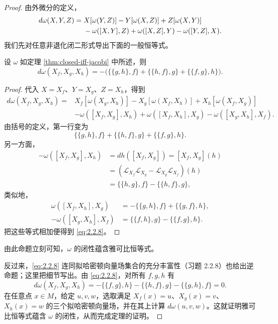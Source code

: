 \begin{proof}
由外微分的定义，
\begin{align}
  d\omega(X,Y,Z)
  ={}&X[\omega(Y,Z)]-Y[\omega(X,Z)]+Z[\omega(X,Y)] \notag\\
    &-\omega([X,Y],Z)+\omega([X,Z],Y)-\omega([Y,Z],X).
  \label{eq:2.2.7}
\end{align}
我们先对任意非退化闭二形式导出下面的一般恒等式。

\begin{proposition}
\label{prop:domega-jacobiator}
设 $\omega$ 如定理 \ref{thm:closed-iff-jacobi} 中所述，则
\begin{equation}
  d\omega(X_f,X_g,X_h)
  =-\bigl(\{\{g,h\},f\}+\{\{h,f\},g\}+\{\{f,g\},h\}\bigr).
  \label{eq:2.2.8}
\end{equation}
\end{proposition}

\begin{proof}
代入 $X=X_f$、$Y=X_g$、$Z=X_h$，得到
\begin{align*}
 d\omega(X_f,X_g,X_h)
 ={}&X_f[\omega(X_g,X_h)]-X_g[\omega(X_f,X_h)]+X_h[\omega(X_f,X_g)]\\
 &-\omega([X_f,X_g],X_h)+\omega([X_f,X_h],X_g)-\omega([X_g,X_h],X_f).
\end{align*}
由括号的定义，第一行变为
\[
  \{\{g,h\},f\}+\{\{h,f\},g\}+\{\{f,g\},h\}.
\]
另一方面，
\begin{align*}
 -\omega([X_f,X_g],X_h)
 &=dh([X_f,X_g])=[X_f,X_g](h)\\
 &=(\mathcal L_{X_f}\mathcal L_{X_g}-\mathcal L_{X_g}\mathcal L_{X_f})(h)\\
 &=\{\{h,g\},f\}-\{\{h,f\},g\},
\end{align*}
类似地，
\begin{align*}
 \omega([X_f,X_h],X_g)&=-\{\{g,h\},f\}+\{\{g,f\},h\},\\
 -\omega([X_g,X_h],X_f)&=\{\{f,h\},g\}-\{\{f,g\},h\}.
\end{align*}
把这些等式相加便得到 \eqref{eq:2.2.8}。
\end{proof}

由此命题立刻可知，$\omega$ 的闭性蕴含雅可比恒等式。

反过来，\eqref{eq:2.2.8} 连同拟哈密顿向量场集合的充分丰富性（习题 2.2.8）也给出逆命题；这里把细节写出。由 \eqref{eq:2.2.8}，对所有 $f,g,h$ 有
\[
  d\omega(X_f,X_g,X_h)
  =-\{\{f,g\},h\}-\{\{h,f\},g\}-\{\{g,h\},f\}=0.
\]
在任意点 $x\in M$，给定 $u,v,w$，选取满足
$X_f(x)=u$、$X_g(x)=v$、$X_h(x)=w$ 的三个拟哈密顿向量场，并在其上计算 $d\omega(u,v,w)$。这就证明雅可比恒等式蕴含 $\omega$ 的闭性，从而完成定理的证明。
\end{proof}

